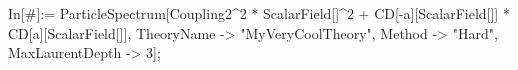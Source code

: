 In[\#]:= ParticleSpectrum[Coupling2^2 * ScalarField[]^2 + CD[-a][ScalarField[]] * CD[a][ScalarField[]], TheoryName -> "MyVeryCoolTheory", Method -> "Hard", MaxLaurentDepth -> 3]; 
